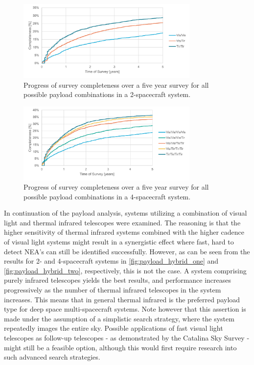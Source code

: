 \begin{figure}[htbp]
 \centering
 \includegraphics[width=0.8\textwidth]{img/tir_vs_vis_2_hybrid.pdf}
 \caption{Progress of survey completeness over a five year survey for all possible payload combinations in a 2-spacecraft system.}
 \label{fig:payload_hybrid_one}
\end{figure}

\begin{figure}[htbp]
 \centering
 \includegraphics[width=0.8\textwidth]{img/tir_vs_vis_4_hybrid.pdf}
 \caption{Progress of survey completeness over a five year survey for all possible payload combinations in a 4-spacecraft system.}
 \label{fig:payload_hybrid_two}
\end{figure}

In continuation of the payload analysis, systems utilizing a combination of visual light and thermal infrared telescopes were examined. The reasoning is that the higher sensitivity of thermal infrared systems combined with the higher cadence of visual light systems might result in a synergistic effect where fast, hard to detect NEA's can still be identified successfully. However, as can be seen from the results for 2- and 4-spacecraft systems in \autoref{fig:payload_hybrid_one} and \autoref{fig:payload_hybrid_two}, respectively, this is not the case. A system comprising purely infrared telescopes yields the best results, and performance increases progressively as the number of thermal infrared telescopes in the system increases. This means that in general thermal infrared is the preferred payload type for deep space multi-spacecraft systems. Note however that this assertion is made under the assumption of a simplistic search strategy, where the system repeatedly images the entire sky. Possible applications of fast visual light telescopes as follow-up telescopes - as demonstrated by the Catalina Sky Survey - might still be a feasible option, although this would first require research into such advanced search strategies.

